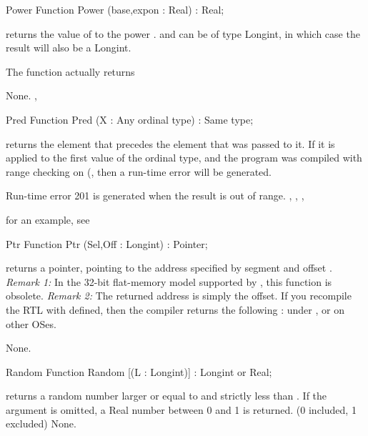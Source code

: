 \documentclass{report}
\begin{document}
\html{}
\begin{function}{Power}
\Declaration
Function Power (base,expon : Real) : Real;

\Description

 returns the value of  to the power . 
 and  can be of type Longint, in which case the 
result will also be a Longint.
 
The function actually returns 

\Errors
None.
\SeeAlso
{}, 
\end{function}
\html{}
\begin{function}{Pred}
\Declaration
Function Pred (X : Any ordinal type) : Same type;

\Description
  returns the element that precedes the element that was passed
to it. If it is applied to the first value of the ordinal type, and the
program was compiled with range checking on (, then a run-time
error will be generated.

\Errors
Run-time error 201 is generated when the result is out of
range.
\SeeAlso
{}, , , 
\end{function}
for an example, see 
\html{}
\begin{function}{Ptr}
\Declaration
Function Ptr (Sel,Off : Longint) : Pointer;

\Description

 returns a pointer, pointing to the address specified by
segment  and offset .
{\em Remark 1:} In the 32-bit flat-memory model supported by \fpc, this
function is obsolete.
{\em Remark 2:} The returned address is simply the offset. If you recompile
the RTL with  defined, then the compiler returns the
following :  under \dos, or
 on other OSes.

\Errors
None.
\SeeAlso
{}
\end{function}
\html{}
\begin{function}{Random}
\Declaration
Function Random [(L : Longint)] : Longint or Real;

\Description
{} returns a random number larger or equal to  and
strictly less than .
If the argument  is omitted, a Real number between 0 and 1 is returned.
(0 included, 1 excluded)
\Errors
None.
\SeeAlso
{}
\end{function}
\end{document}
